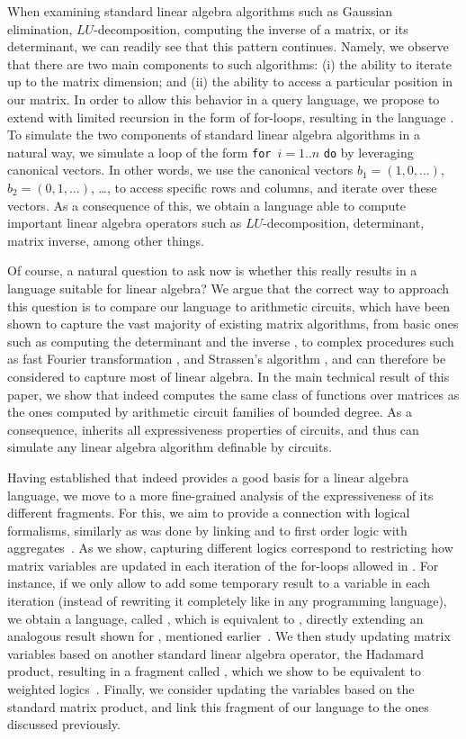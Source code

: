 When examining standard linear algebra algorithms such as Gaussian elimination, $LU$-decomposition, computing the inverse of a matrix, or its determinant, we can readily see that this pattern continues. Namely, we observe that there are two main components to such algorithms: (i) the ability to iterate up to the matrix dimension; and (ii) the ability to access a particular position in our matrix. In order to allow this behavior in a query language, we propose to extend \lang with limited recursion in the form of for-loops, resulting in the language \langfor. To  simulate the two components of standard linear algebra algorithms in a natural way, we simulate a loop of the form \texttt{for}\, $i=1..n$ \texttt{do} by leveraging canonical vectors. In other words, we use the canonical vectors $b_1=(1,0,\ldots)$, $b_2=(0,1,\ldots)$, \ldots, to access specific rows and columns, and iterate over these vectors. As a consequence of this, we obtain a language able to compute important linear algebra operators such as $LU$-decomposition, determinant, matrix inverse, among other things.

Of course, a natural question to ask now is whether this really results in a language suitable for linear algebra? We argue that the correct way to approach this question is to compare our language to arithmetic circuits, which have been shown to capture the vast majority of existing matrix algorithms, from basic ones such as computing the determinant \cite{} and the inverse \cite{}, to complex procedures such as fast Fourier transformation \cite{}, and Strassen's algorithm \cite{}, and can therefore be considered to capture most of linear algebra. In the main technical result of this paper, we show that \langfor indeed computes the same class of functions over matrices as the ones computed by arithmetic circuit families of bounded degree.  As a consequence, \langfor inherits all expressiveness properties of circuits, and thus can simulate any linear algebra algorithm definable by circuits.

Having established that \langfor indeed provides a good basis for a linear algebra language, we move to a more fine-grained analysis of the expressiveness of its different fragments. For this, we aim to provide a connection with logical formalisms, similarly as was done by linking \lara and \lang to first order logic with aggregates~\cite{BarceloH0S20,matlang-journal}. As we show, capturing different logics correspond to restricting how matrix variables are updated in each iteration of the for-loops allowed in \langfor. For instance, if we only allow to add some temporary result to a variable in each iteration (instead of rewriting it completely like in any programming language), we obtain a language, called \langsum, which is equivalent to \rak, directly extending an analogous result shown for \lang, mentioned earlier~\cite{brijder2019matrices}. We then study updating matrix variables based on another standard linear algebra operator, the Hadamard product, resulting in a fragment called \langprod, which we show to be equivalent to weighted logics~\cite{DrosteG05}. Finally, we consider updating the variables based on the standard matrix product, and link this fragment of our language to the ones discussed previously.  


